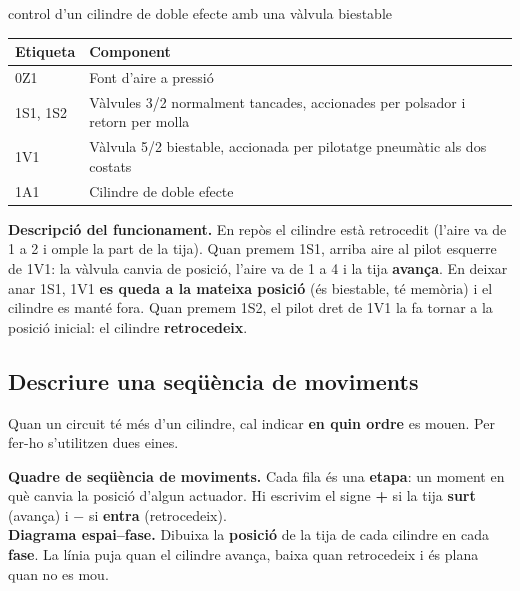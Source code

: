 \begin{exemple}{control d'un cilindre de doble efecte amb una vàlvula biestable}
\begin{center}\circuitB\end{center}
\begin{center}
\renewcommand{\arraystretch}{1.3}
\begin{tabular}{@{}ll@{}}
\toprule
\textbf{Etiqueta} & \textbf{Component}\\\midrule
0Z1 & Font d'aire a pressió\\
1S1, 1S2 & Vàlvules 3/2 normalment tancades, accionades per polsador i retorn per molla\\
1V1 & Vàlvula 5/2 biestable, accionada per pilotatge pneumàtic als dos costats\\
1A1 & Cilindre de doble efecte\\
\bottomrule
\end{tabular}
\end{center}
\textbf{Descripció del funcionament.} En repòs el cilindre està retrocedit (l'aire va de 1 a 2 i omple la part de la tija). Quan premem 1S1, arriba aire al pilot esquerre de 1V1: la vàlvula canvia de posició, l'aire va de 1 a 4 i la tija \textbf{avança}. En deixar anar 1S1, 1V1 \textbf{es queda a la mateixa posició} (és biestable, té memòria) i el cilindre es manté fora. Quan premem 1S2, el pilot dret de 1V1 la fa tornar a la posició inicial: el cilindre \textbf{retrocedeix}.
\end{exemple}

\subsection*{Descriure una seqüència de moviments}

Quan un circuit té més d'un cilindre, cal indicar \textbf{en quin ordre} es mouen. Per fer-ho s'utilitzen dues eines.

\begin{idea}
\textbf{Quadre de seqüència de moviments.} Cada fila és una \textbf{etapa}: un moment en què canvia la posició d'algun actuador. Hi escrivim el signe \textbf{+} si la tija \textbf{surt} (avança) i \textbf{$-$} si \textbf{entra} (retrocedeix).\\[0.4em]
\textbf{Diagrama espai--fase.} Dibuixa la \textbf{posició} de la tija de cada cilindre en cada \textbf{fase}. La línia puja quan el cilindre avança, baixa quan retrocedeix i és plana quan no es mou.
\end{idea}

